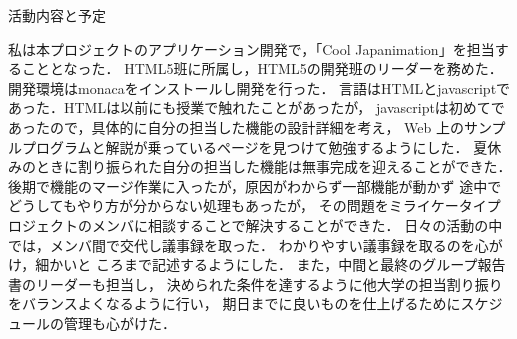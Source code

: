 \par 
活動内容と予定
\par
私は本プロジェクトのアプリケーション開発で，「Cool Japanimation」を担当することとなった．
HTML5班に所属し，HTML5の開発班のリーダーを務めた．
開発環境はmonacaをインストールし開発を行った．
言語はHTMLとjavascriptであった．HTMLは以前にも授業で触れたことがあったが，
javascriptは初めてであったので，具体的に自分の担当した機能の設計詳細を考え，
Web 上のサンプルプログラムと解説が乗っているページを見つけて勉強するようにした．
夏休みのときに割り振られた自分の担当した機能は無事完成を迎えることができた．
後期で機能のマージ作業に入ったが，原因がわからず一部機能が動かず
途中でどうしてもやり方が分からない処理もあったが，
その問題をミライケータイプロジェクトのメンバに相談することで解決することができた．
日々の活動の中では，メンバ間で交代し議事録を取った．
わかりやすい議事録を取るのを心がけ，細かいと
ころまで記述するようにした．
また，中間と最終のグループ報告書のリーダーも担当し，
決められた条件を達するように他大学の担当割り振りをバランスよくなるように行い，
期日までに良いものを仕上げるためにスケジュールの管理も心がけた．
